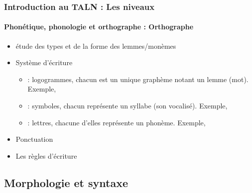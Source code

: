 \documentclass[xcolor=table]{beamer}
\begin{document}
\begin{frame}
\frametitle{Introduction au TALN : Les niveaux}
\framesubtitle{Phonétique, phonologie et orthographe : Orthographe}

\begin{itemize}
	\item étude des types et de la forme des lemmes/monèmes 
	\item Système d'écriture
	\begin{itemize}
		\item {} : logogrammes, chacun est un unique graphème notant un lemme (mot).
		Exemple, 
		\item {} : symboles, chacun représente un syllabe (son vocalisé). 
		Exemple, 
		\item {} : lettres, chacune d'elles représente un phonème. 
		Exemple, 
	\end{itemize}
	\item Ponctuation 
	\item Les règles d'écriture 
\end{itemize}

\end{frame}

\subsection{Morphologie et syntaxe}
\end{document}
